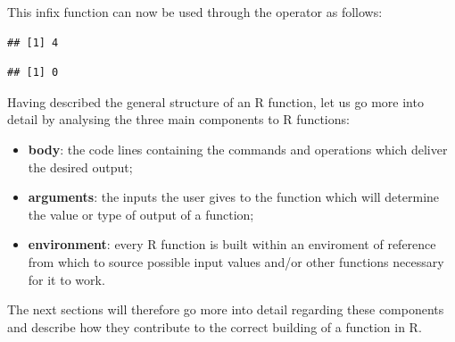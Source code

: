 \documentclass[12pt,]{krantz}
\newenvironment{Shaded}{\begin{snugshade}}{\end{snugshade}}
\newcommand{\DataTypeTok}[1]{\textcolor[rgb]{0.27,0.27,0.27}{#1}}
\newcommand{\DecValTok}[1]{\textcolor[rgb]{0.06,0.06,0.06}{#1}}
\newcommand{\StringTok}[1]{\textcolor[rgb]{0.5,0.5,0.5}{#1}}
\newcommand{\ControlFlowTok}[1]{\textcolor[rgb]{0.27,0.27,0.27}{\textbf{#1}}}
\newcommand{\OperatorTok}[1]{\textcolor[rgb]{0.43,0.43,0.43}{\textbf{#1}}}
\newcommand{\NormalTok}[1]{#1}
\providecommand{\tightlist}{%
  \setlength{\itemsep}{0pt}\setlength{\parskip}{0pt}}
\begin{document}
\begin{Shaded}
\end{Shaded}

This infix function can now be used through the operator as follows:

\begin{Shaded}
\end{Shaded}

\begin{verbatim}
## [1] 4
\end{verbatim}

\begin{Shaded}
\end{Shaded}

\begin{verbatim}
## [1] 0
\end{verbatim}

Having described the general structure of an R function, let us go more
into detail by analysing the three main components to R functions:

\begin{itemize}
\tightlist
\item
  \textbf{body}: the code lines containing the commands and operations
  which deliver the desired output;
\item
  \textbf{arguments}: the inputs the user gives to the function which
  will determine the value or type of output of a function;
\item
  \textbf{environment}: every R function is built within an enviroment
  of reference from which to source possible input values and/or other
  functions necessary for it to work.
\end{itemize}

The next sections will therefore go more into detail regarding these
components and describe how they contribute to the correct building of a
function in R.
\end{document}
